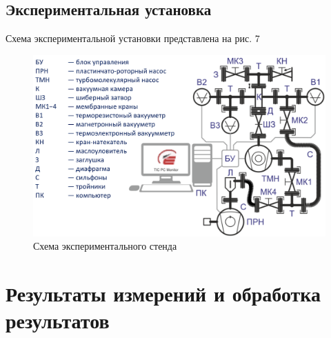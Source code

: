 \documentclass[a4paper,12pt]{article}
\theoremstyle{plain} %
\theoremstyle{definition} %
\theoremstyle{remark} %
\begin{document}
\subsection{Экспериментальная установка}
Схема экспериментальной установки представлена на рис. 7
\begin{figure}[H]
	\begin{center}
		\includegraphics[width=\linewidth]{7}
		\caption{Схема экспериментального стенда}
	\end{center}
\end{figure}
\section{Результаты измерений и обработка результатов}
\end{document}
